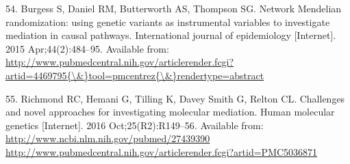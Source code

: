 \documentclass[]{article}
\begin{document}
\hypertarget{ref-Burgess2015}{}
54. Burgess S, Daniel RM, Butterworth AS, Thompson SG. Network Mendelian
randomization: using genetic variants as instrumental variables to
investigate mediation in causal pathways. International journal of
epidemiology {[}Internet{]}. 2015 Apr;44(2):484--95. Available from:
\href{http://www.pubmedcentral.nih.gov/articlerender.fcgi?artid=4469795\%7B/\&\%7Dtool=pmcentrez\%7B/\&\%7Drendertype=abstract}{http://www.pubmedcentral.nih.gov/articlerender.fcgi?artid=4469795\{\textbackslash{}\&\}tool=pmcentrez\{\textbackslash{}\&\}rendertype=abstract}

\hypertarget{ref-Richmond2016}{}
55. Richmond RC, Hemani G, Tilling K, Davey Smith G, Relton CL.
Challenges and novel approaches for investigating molecular mediation.
Human molecular genetics {[}Internet{]}. 2016 Oct;25(R2):R149--56.
Available from:
\href{http://www.ncbi.nlm.nih.gov/pubmed/27439390\%20http://www.pubmedcentral.nih.gov/articlerender.fcgi?artid=PMC5036871}{http://www.ncbi.nlm.nih.gov/pubmed/27439390 http://www.pubmedcentral.nih.gov/articlerender.fcgi?artid=PMC5036871}
\end{document}
